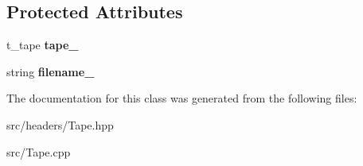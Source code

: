 \subsection*{Protected Attributes}
\begin{DoxyCompactItemize}
\item 
\hypertarget{classTape_af86585d00cfbcf8e14d4188f0ae4ec25}{t\-\_\-tape {\bfseries tape\-\_\-}}\label{classTape_af86585d00cfbcf8e14d4188f0ae4ec25}

\item 
\hypertarget{classTape_aed2ca258c7ab970769e97fa6b9ef4c6e}{string {\bfseries filename\-\_\-}}\label{classTape_aed2ca258c7ab970769e97fa6b9ef4c6e}

\end{DoxyCompactItemize}


The documentation for this class was generated from the following files\-:\begin{DoxyCompactItemize}
\item 
src/headers/Tape.\-hpp\item 
src/Tape.\-cpp\end{DoxyCompactItemize}
